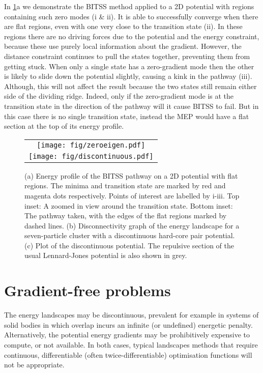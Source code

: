 \documentclass[aps,twocolumn]{revtex4}
\begin{document}
\topic In \cref{fig:flatdiscontinuous}a we demonstrate the BITSS method applied to a 2D potential with regions containing such zero modes (i \& ii).
It is able to successfully converge when there are flat regions, even with one very close to the transition state (ii).
In these regions there are no driving forces due to the potential and the energy constraint, because these use purely local information about the gradient.
However, the distance constraint continues to pull the states together, preventing them from getting stuck.
When only a single state has a zero-gradient mode then the other is likely to slide down the potential slightly, causing a kink in the pathway (iii).
Although, this will not affect the result because the two states still remain either side of the dividing ridge.
Indeed, only if the zero-gradient mode is at the transition state in the direction of the pathway will it cause BITSS to fail.
But in this case there is no single transition state, instead the MEP would have a flat section at the top of its energy profile.


\begin{figure}[htb]
  \centering
  \begin{tabular}[b]{c}
    \texttt{[image: fig/zeroeigen.pdf]}\\
    \texttt{[image: fig/discontinuous.pdf]}
  \end{tabular}
  \caption{
    (a) Energy profile of the BITSS pathway on a 2D potential with flat regions.
        The minima and transition state are marked by red and magenta dots respectively.
        Points of interest are labelled by i-iii.
        Top inset: A zoomed in view around the transition state.
        Bottom inset: The pathway taken, with the edges of the flat regions marked by dashed lines.
    (b) Disconnectivity graph of the energy landscape for a seven-particle cluster with a discontinuous hard-core pair potential.
    (c) Plot of the discontinuous potential.
        The repulsive section of the usual Lennard-Jones potential is also shown in grey.
  }
  \label{fig:flatdiscontinuous}
\end{figure}


\section{Gradient-free problems}
\topic The energy landscapes may be discontinuous, prevalent for example in systems of solid bodies in which overlap incurs an infinite (or undefined) energetic penalty.
Alternatively, the potential energy gradients may be prohibitively expensive to compute, or not available.
In both cases, typical landscapes methods that require continuous, differentiable (often twice-differentiable) optimisation functions will not be appropriate.
\end{document}
